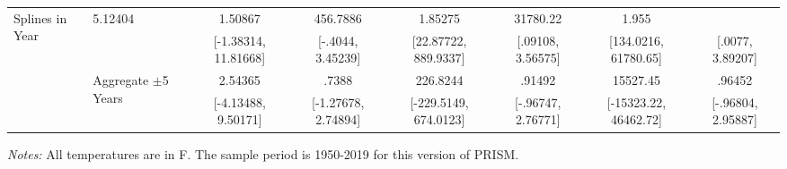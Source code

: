 \begin{landscape}
\begin{table}[htb]
\begin{threeparttable}
{\begin{tabular}{llcccccc}
\multirow{2}{*}{Splines in Year} & 5.12404 & 1.50867 & 456.7886 & 1.85275 & 31780.22 & 1.955 \\  & & [-1.38314, 11.81668] & [-.4044, 3.45239] & [22.87722, 889.9337] & [.09108, 3.56575] & [134.0216, 61780.65] & [.0077, 3.89207] \\  & \multirow{2}{*}{Aggregate \(\pm\)5 Years} & 2.54365 & .7388 & 226.8244 & .91492 & 15527.45 & .96452 \\  & & [-4.13488, 9.50171] & [-1.27678, 2.74894] & [-229.5149, 674.0123] & [-.96747, 2.76771] & [-15323.22, 46462.72] & [-.96804, 2.95887] \\
\hline \hline
\end{tabular}
}
\begin{tablenotes}
\footnotesize \textit{Notes:} All temperatures are in \degree F. The sample period is 1950-2019 for this version of PRISM.
\end{tablenotes}
\end{threeparttable}
\end{table}
\end{landscape}
\restoregeometry
